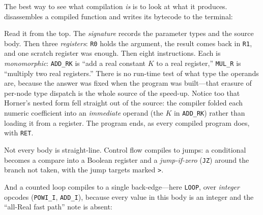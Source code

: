 The best way to see what compilation \emph{is} is to look at what it produces.
 disassembles a compiled function and writes its bytecode to the
terminal:


Read it from the top. The \emph{signature} records the parameter types and the
source body. Then three \emph{registers}: \texttt{R0} holds the argument, the
result comes back in \texttt{R1}, and one scratch register was enough. Then eight
instructions. Each is \emph{monomorphic}:
\texttt{ADD\_RK} is ``add a real constant \(K\) to a real register,''
\texttt{MUL\_R} is ``multiply two real registers.'' There is no run-time test of
what type the operands are, because the answer was fixed when the program was
built---that erasure of per-node type dispatch is the whole source of the
speed-up. Notice too that Horner's nested form fell straight out of the source:
the compiler folded each numeric coefficient into an \emph{immediate} operand
(the \(K\) in \texttt{ADD\_RK}) rather than loading it from a register. The
program ends, as every compiled program does, with \texttt{RET}.

Not every body is straight-line. Control flow compiles to
jumps: a conditional becomes a compare into a
Boolean register and a \emph{jump-if-zero} (\texttt{JZ}) around the branch not
taken, with the jump targets marked \texttt{>}.


And a counted loop compiles to a single back-edge---here \texttt{LOOP}, over
\emph{integer} opcodes (\texttt{POWI\_I}, \texttt{ADD\_I}), because every value in
this body is an integer and the ``all-Real fast path'' note is absent:



